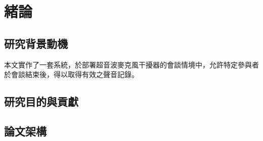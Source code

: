 \chapter{緒論}

\section{研究背景動機}

    本文實作了一套系統，於部署超音波麥克風干擾器的會談情境中，允許特定參與者於會談結束後，得以取得有效之聲音記錄。


\section{研究目的與貢獻}

\section{論文架構}